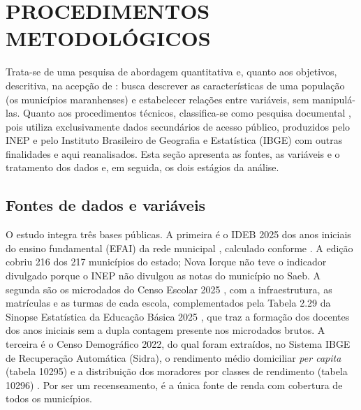 \section{PROCEDIMENTOS METODOLÓGICOS}
\label{sec:metodos}

Trata-se de uma pesquisa de abordagem quantitativa e, quanto aos objetivos, descritiva, na acepção de \textcite{gil2017}: busca descrever as características de uma população (os municípios maranhenses) e estabelecer relações entre variáveis, sem manipulá-las. Quanto aos procedimentos técnicos, classifica-se como pesquisa documental \parencite{gil2017}, pois utiliza exclusivamente dados secundários de acesso público, produzidos pelo INEP e pelo Instituto Brasileiro de Geografia e Estatística (IBGE) com outras finalidades e aqui reanalisados. Esta seção apresenta as fontes, as variáveis e o tratamento dos dados e, em seguida, os dois estágios da análise.

\subsection{Fontes de dados e variáveis}

O estudo integra três bases públicas. A primeira é o IDEB 2025 dos anos iniciais do ensino fundamental (EFAI) da rede municipal \parencite{inep2025}, calculado conforme \textcite{fernandes2007}. A edição cobriu 216 dos 217 municípios do estado; Nova Iorque não teve o indicador divulgado porque o INEP não divulgou as notas do município no Saeb. A segunda são os microdados do Censo Escolar 2025 \parencite{inep2026microdados}, com a infraestrutura, as matrículas e as turmas de cada escola, complementados pela Tabela 2.29 da Sinopse Estatística da Educação Básica 2025 \parencite{inep2026sinopse}, que traz a formação dos docentes dos anos iniciais sem a dupla contagem presente nos microdados brutos. A terceira é o Censo Demográfico 2022, do qual foram extraídos, no Sistema IBGE de Recuperação Automática (Sidra), o rendimento médio domiciliar \textit{per capita} (tabela 10295) \parencite{ibge2022} e a distribuição dos moradores por classes de rendimento (tabela 10296) \parencite{ibge2022classes}. Por ser um recenseamento, é a única fonte de renda com cobertura de todos os municípios.

